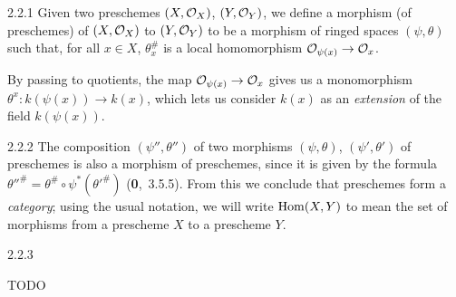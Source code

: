 \documentclass[../main.tex]{subfiles}
\begin{document}
\begin{cx}[Definition]{2.2.1}
    Given two preschemes $(X,\mathcal{O}_X)$, $(Y,\mathcal{O}_Y)$, we define a morphism (of preschemes) of $(X,\mathcal{O}_X)$ to $(Y,\mathcal{O}_Y)$ to be a morphism of ringed spaces $(\psi,\theta)$ such that, for all $x\in X$, $\theta_x^\#$ is a local homomorphism $\mathcal{O}_{\psi(x)}\to\mathcal{O}_x$.
\end{cx}

By passing to quotients, the map $\mathcal{O}_{\psi(x)}\to\mathcal{O}_x$ gives us a monomorphism $\theta^x\colon k(\psi(x))\to k(x)$, which lets us consider $k(x)$ as an \emph{extension} of the field $k(\psi(x))$.

\begin{cx}{2.2.2}
    The composition $(\psi'',\theta'')$ of two morphisms $(\psi,\theta)$, $(\psi',\theta')$ of preschemes is also a morphism of preschemes, since it is given by the formula $\theta''^\#=\theta^\#\circ\psi^*(\theta'^\#)$ (\textbf{0},~3.5.5).
    From this we conclude that preschemes form a \emph{category}; using the usual notation, we will write $\operatorname*{Hom}(X,Y)$ to mean the set of morphisms from a prescheme $X$ to a prescheme $Y$.
\end{cx}

\begin{cx}[Example]{2.2.3}
\end{cx}

TODO
\end{document}
